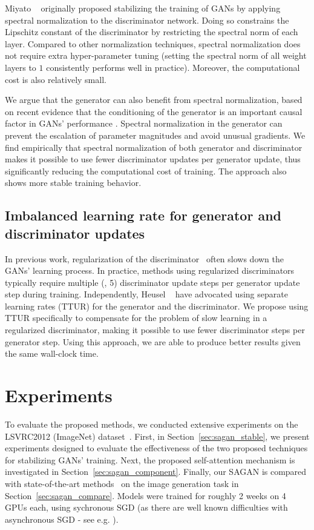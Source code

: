 \documentclass{article}
\begin{document}
Miyato \etal~\cite{Miyato18a} originally proposed stabilizing the training of GANs by applying spectral normalization to the discriminator network.
Doing so constrains the Lipschitz constant of the discriminator by restricting the spectral norm of each layer.
Compared to other normalization techniques, spectral normalization does not require extra hyper-parameter tuning (setting the spectral norm of all weight layers to $1$ consistently performs well in practice).
Moreover, the computational cost is also relatively small.


We argue that the generator can also benefit from spectral normalization, based on recent evidence that the conditioning of the generator is an important causal factor in GANs' performance \cite{Odena18}.
Spectral normalization in the generator can prevent the escalation of parameter magnitudes and avoid unusual gradients.
We find empirically that spectral normalization of both generator and discriminator makes it possible to use fewer discriminator updates per generator update, thus significantly reducing the computational cost of training. The approach also shows more stable training behavior.



\subsection{Imbalanced learning rate for generator and discriminator updates}

In previous work, regularization of the discriminator~\cite{Miyato18a, GulrajaniAADC17} often slows down the GANs' learning process.
In practice, methods using regularized discriminators typically require multiple (\eg, 5) discriminator update steps per generator update step during training.
Independently, Heusel \etal~\cite{HeuselRUNH17} have advocated using separate learning rates (TTUR) for the generator and the discriminator.
We propose using TTUR specifically to compensate for the problem of slow learning in a regularized discriminator, making it possible to use fewer discriminator steps per generator step.
Using this approach, we are able to produce better results given the same wall-clock time.


\section{Experiments}\label{sec:sagan_exp}

To evaluate the proposed methods, we conducted extensive experiments on the LSVRC2012 (ImageNet) dataset~\cite{ILSVRC15}. First, in Section~\ref{sec:sagan_stable}, we present experiments designed to evaluate the effectiveness of the two proposed techniques for stabilizing GANs' training. Next, the proposed self-attention mechanism is investigated in Section~\ref{sec:sagan_component}. Finally, our SAGAN is compared with state-of-the-art methods~\cite{Odena2016,Miyato18b} on the image generation task in Section~\ref{sec:sagan_compare}.
Models were trained for roughly 2 weeks on 4 GPUs each, using sychronous SGD (as there are well known difficulties with asynchronous SGD - see e.g. \cite{FASGD}).
 
\end{document}
